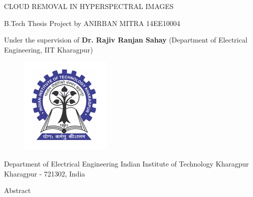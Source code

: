 \documentclass[a4paper, 15pt]{article}
\date{\vspace{-5ex}}
\begin{document}
	\graphicspath{{images/}}
	\thispagestyle{empty}
	\begin{center}
		{\fontsize{30}{50}\selectfont CLOUD REMOVAL IN \linebreak \linebreak HYPERSPECTRAL IMAGES}
	\end{center}
	\begin{center}
	\end{center}
	\begin{center}
		{\fontsize{20}{20}\selectfont B.Tech Thesis Project \linebreak by \linebreak ANIRBAN MITRA \linebreak \linebreak 14EE10004}
	\end{center}
	\begin{center}
	\end{center}
	\begin{center}
		{\fontsize{20}{20}\selectfont Under the supervision of \linebreak \textbf{Dr. Rajiv Ranjan Sahay} \linebreak (Department of Electrical Engineering, IIT Kharagpur)}
	\end{center}
	\begin{figure}[h]
		\centering
		\includegraphics[scale=1.2]{kgplogo.png}
		\label{fig:kgplogo}
	\end{figure}
	\begin{center}
		{\fontsize{20}{20}\selectfont Department of Electrical Engineering \linebreak Indian Institute of Technology Kharagpur \linebreak 
			Kharagpur - 721302, India}
	\end{center}
	\newpage
	\setcounter{page}{1}
	\begin{center}
		{\fontsize{40}{50}\selectfont Abstract}
	\end{center}
	\par 
\end{document}

